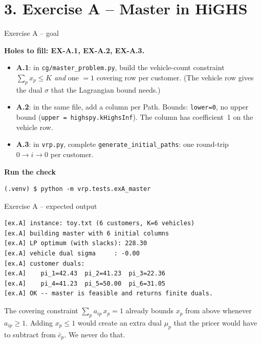 \documentclass[10pt,aspectratio=169]{beamer}
\newcommand{\redcost}{\bar{c}}
\begin{document}
\section{3. Exercise A -- Master in HiGHS}

\begin{frame}[fragile]{Exercise A -- goal}
  \begin{exbox}
    \textbf{Holes to fill: EX-A.1, EX-A.2, EX-A.3.}
    \begin{itemize}\small
      \item \textbf{A.1}: in \texttt{cg/master\_problem.py}, build the
            \alert{vehicle-count constraint} $\sum_p x_p\!\le\!K$ \emph{and}
            one $=\!1$ covering row per customer. (The vehicle row gives
            the dual $\sigma$ that the Lagrangian bound needs.)
      \item \textbf{A.2}: in the same file, add a column per Path.
            Bounds: \texttt{lower=0}, \alert{no upper bound}
            (\texttt{upper = highspy.kHighsInf}). The column has
            coefficient~1 on the vehicle row.
      \item \textbf{A.3}: in \texttt{vrp.py}, complete
            \texttt{generate\_initial\_paths}: one round-trip
            $0\!\to\!i\!\to\!0$ per customer.
    \end{itemize}
  \end{exbox}
  \medskip
  \textbf{Run the check}
\begin{lstlisting}[style=sh]
(.venv) $ python -m vrp.tests.exA_master
\end{lstlisting}
\end{frame}

\begin{frame}[fragile]{Exercise A -- expected output}
\begin{lstlisting}[style=sh]
[ex.A] instance: toy.txt (6 customers, K=6 vehicles)
[ex.A] building master with 6 initial columns
[ex.A] LP optimum (with slacks): 228.30
[ex.A] vehicle dual sigma     : -0.00
[ex.A] customer duals:
[ex.A]    pi_1=42.43  pi_2=41.23  pi_3=22.36
[ex.A]    pi_4=41.23  pi_5=50.00  pi_6=31.05
[ex.A] OK -- master is feasible and returns finite duals.
\end{lstlisting}
  \begin{tipbox}
    The covering constraint $\sum_p a_{ip}\,x_p=1$ already bounds $x_p$
    from above whenever $a_{ip}\ge 1$. Adding $x_p\!\le\!1$ would create an
    extra dual $\mu_p$ that the pricer would have to subtract from
    $\redcost_p$. We never do that.
  \end{tipbox}
\end{frame}
\end{document}
